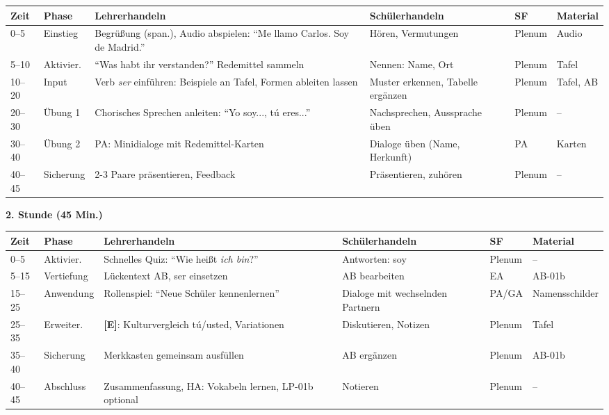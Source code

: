 \documentclass[11pt,a4paper]{article}
\newcommand{\E}{\textcolor{erweiterung}{\textbf{[E]}}}
\begin{document}
\begin{longtable}{|p{1cm}|p{1.5cm}|p{4cm}|p{3cm}|p{1.5cm}|p{2cm}|}
\hline
\textbf{Zeit} & \textbf{Phase} & \textbf{Lehrerhandeln} & \textbf{Schülerhandeln} & \textbf{SF} & \textbf{Material} \\
\hline
\endhead

0--5 & Einstieg & Begrüßung (span.), Audio abspielen: ``Me llamo Carlos. Soy de Madrid.'' & Hören, Vermutungen & Plenum & Audio \\
\hline

5--10 & Aktivier. & ``Was habt ihr verstanden?'' Redemittel sammeln & Nennen: Name, Ort & Plenum & Tafel \\
\hline

10--20 & Input & Verb \textit{ser} einführen: Beispiele an Tafel, Formen ableiten lassen & Muster erkennen, Tabelle ergänzen & Plenum & Tafel, AB \\
\hline

20--30 & Übung 1 & Chorisches Sprechen anleiten: ``Yo soy..., tú eres...'' & Nachsprechen, Aussprache üben & Plenum & -- \\
\hline

30--40 & Übung 2 & PA: Minidialoge mit Redemittel-Karten & Dialoge üben (Name, Herkunft) & PA & Karten \\
\hline

40--45 & Sicherung & 2-3 Paare präsentieren, Feedback & Präsentieren, zuhören & Plenum & -- \\
\hline
\end{longtable}

\vspace{1em}

\textbf{2. Stunde (45 Min.)}

\begin{longtable}{|p{1cm}|p{1.5cm}|p{4cm}|p{3cm}|p{1.5cm}|p{2cm}|}
\hline
\textbf{Zeit} & \textbf{Phase} & \textbf{Lehrerhandeln} & \textbf{Schülerhandeln} & \textbf{SF} & \textbf{Material} \\
\hline
\endhead

0--5 & Aktivier. & Schnelles Quiz: ``Wie heißt \textit{ich bin}?'' & Antworten: soy & Plenum & -- \\
\hline

5--15 & Vertiefung & Lückentext AB, ser einsetzen & AB bearbeiten & EA & AB-01b \\
\hline

15--25 & Anwendung & Rollenspiel: ``Neue Schüler kennenlernen'' & Dialoge mit wechselnden Partnern & PA/GA & Namensschilder \\
\hline

25--35 & Erweiter. & \E{}: Kulturvergleich tú/usted, Variationen & Diskutieren, Notizen & Plenum & Tafel \\
\hline

35--40 & Sicherung & Merkkasten gemeinsam ausfüllen & AB ergänzen & Plenum & AB-01b \\
\hline

40--45 & Abschluss & Zusammenfassung, HA: Vokabeln lernen, LP-01b optional & Notieren & Plenum & -- \\
\hline
\end{longtable}
\end{document}
